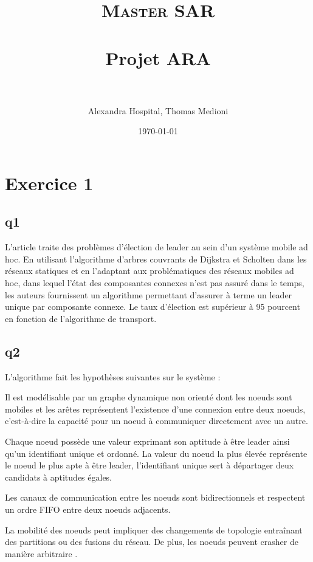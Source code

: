\documentclass[paper=a4, fontsize=11pt]{report} %
\title{	
\normalfont \normalsize 
\textsc{Master SAR} \\ [25pt] %
\horrule{0.5pt} \\[0.4cm] %
\huge Projet ARA \\ %
\horrule{2pt} \\[0.5cm] %
}
\author{Alexandra Hospital, Thomas Medioni} %
\date{\normalsize\today} %
\begin{document}
\maketitle %


\section{Exercice 1}

\subsection{q1}

L'article traite des problèmes d'élection de leader au sein d'un système mobile ad hoc. En utilisant l'algorithme d'arbres couvrants de Dijkstra et Scholten dans les réseaux statiques et en l'adaptant aux problématiques des réseaux mobiles ad hoc, dans lequel l'état des composantes connexes n'est pas assuré dans le temps, les auteurs fournissent un algorithme permettant d'assurer à terme un leader unique par composante connexe. Le taux d'élection est supérieur à 95 pourcent en fonction de l'algorithme de transport.

\subsection{q2}

L'algorithme fait les hypothèses suivantes sur le système :

Il est modélisable par un graphe dynamique non orienté dont les noeuds sont mobiles et les arêtes représentent l'existence d'une connexion entre deux noeuds, c'est-à-dire la capacité pour un noeud à communiquer directement avec un autre.

Chaque noeud possède une valeur exprimant son aptitude à être leader ainsi qu'un identifiant unique et ordonné. La valeur du noeud la plus élevée représente le noeud le plus apte à être leader, l'identifiant unique sert à départager deux candidats à aptitudes égales.

Les canaux de communication entre les noeuds sont bidirectionnels et respectent un ordre FIFO entre deux noeuds adjacents.

La mobilité des noeuds peut impliquer des changements de topologie entraînant des partitions ou des fusions du réseau. De plus, les noeuds peuvent crasher de manière arbitraire .
\end{document}
